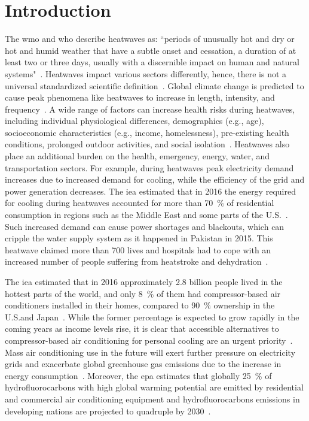 
\section{Introduction}\label{sec:introduction}

The \ac{wmo} and \ac{who} describe heatwaves as: ``periods of unusually hot and dry or hot and humid weather that have a subtle onset and cessation, a duration of at least two or three days, usually with a discernible impact on human and natural systems"~\cite{WMO2015}.
Heatwaves impact various sectors differently, hence, there is not a universal standardized scientific definition~\cite{Perkins2013}.
Global climate change is predicted to cause peak phenomena like heatwaves to increase in length, intensity, and frequency~\cite{Whatharm75:online}.
A wide range of factors can increase health risks during heatwaves, including individual physiological differences, demographics (e.g., age), socioeconomic characteristics (e.g., income, homelessness), pre-existing health conditions, prolonged outdoor activities, and social isolation~\cite{WMO2015}.
Heatwaves also place an additional burden on the health, emergency, energy, water, and transportation sectors. 
For example, during heatwaves peak electricity demand increases due to increased demand for cooling, while the efficiency of the grid and power generation decreases.
The \ac{iea} estimated that in 2016 the energy required for cooling during heatwaves accounted for more than 70~\% of residential consumption in regions such as the Middle East and some parts of the U.S.~\cite{IEA2018}.
Such increased demand can cause power shortages and blackouts, which can cripple the water supply system as it happened in Pakistan in 2015.
This heatwave claimed more than 700 lives and hospitals had to cope with an increased number of people suffering from heatstroke and dehydration~\cite{Masood2015}.

The \ac{iea} estimated that in 2016 approximately 2.8 billion people lived in the hottest parts of the world, and only 8~\% of them had compressor-based air conditioners installed in their homes, compared to 90~\% ownership in the U.S.\@ and Japan~\cite{IEA2018}.
While the former percentage is expected to grow rapidly in the coming years as income levels rise, it is clear that accessible alternatives to compressor-based air conditioning for personal cooling are an urgent priority~\cite{Davis2015}.
Mass air conditioning use in the future will exert further pressure on electricity grids and exacerbate global greenhouse gas emissions due to the increase in energy consumption~\cite{IEA2018}.
Moreover, the \ac{epa} estimates that globally 25~\% of hydrofluorocarbons with high global warming potential are emitted by residential and commercial air conditioning equipment and hydrofluorocarbons emissions in developing nations are projected to quadruple by 2030~\cite{Snap2016}.

